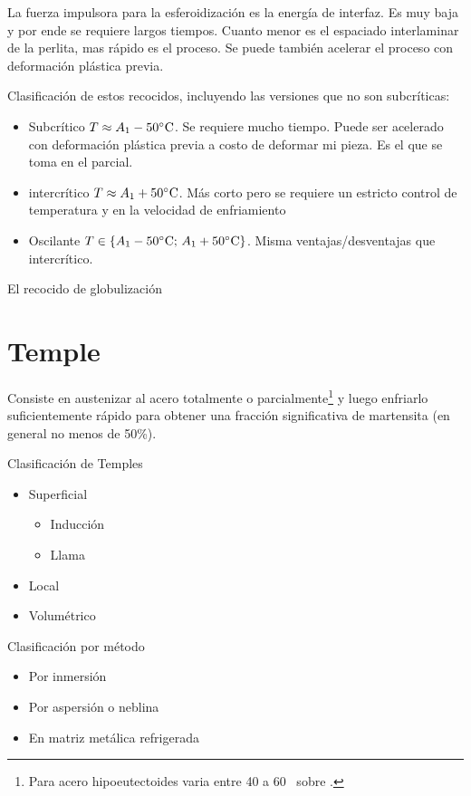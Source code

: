 La fuerza impulsora para la esferoidización es la energía de interfaz. Es muy baja y por ende se requiere largos tiempos. Cuanto menor es el espaciado interlaminar de la perlita, mas rápido es el proceso. Se puede también acelerar el proceso con deformación plástica previa.

Clasificación de estos recocidos, incluyendo las versiones que no son subcríticas:
\begin{itemize}
    \item Subcrítico $T\approx A_{1}-50^\circ \mathrm{C}$. Se requiere mucho tiempo. Puede ser acelerado con deformación plástica previa a costo de deformar mi pieza. Es el que se toma en el parcial.
    \item intercrítico $T\approx A_{1}+50^\circ \mathrm{C}$. Más corto pero se requiere un estricto control de temperatura y en la velocidad de enfriamiento
    \item Oscilante $T\in\{A_{1}-50^\circ \mathrm{C};\,A_{1}+50^\circ \mathrm{C} \}$. Misma ventajas/desventajas que intercrítico.    
\end{itemize}

El recocido de globulización

\section{Temple}

Consiste en austenizar al acero totalmente o parcialmente\footnote{Para acero hipoeutectoides varia entre 40 a 60\grad~ sobre \Athree.} y luego enfriarlo suficientemente rápido para obtener una fracción significativa de martensita (en general no menos de 50\%). 

Clasificación de Temples
\begin{itemize}
    \item Superficial
    \begin{itemize}
        \item Inducción
        \item Llama
    \end{itemize}
    \item Local
    \item Volumétrico
\end{itemize}
Clasificación por método
\begin{itemize}
    \item Por inmersión
    \item Por aspersión o neblina
    \item En matriz metálica refrigerada
\end{itemize}

